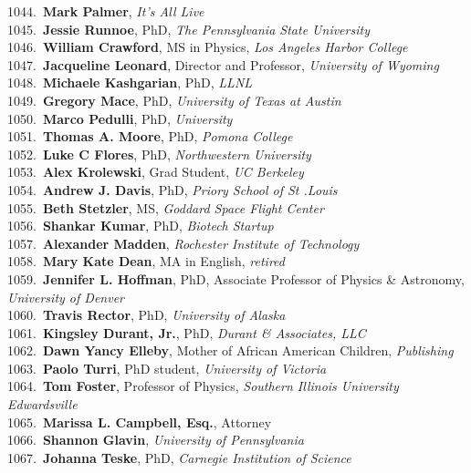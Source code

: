 1044.~{\bf Mark Palmer}, {\sl It's All Live} \\
1045.~{\bf Jessie Runnoe}, PhD, {\sl The Pennsylvania State University} \\
1046.~{\bf William Crawford}, MS in Physics, {\sl Los Angeles Harbor College} \\
1047.~{\bf Jacqueline Leonard}, Director and Professor, {\sl University of Wyoming} \\
1048.~{\bf Michaele Kashgarian}, PhD, {\sl LLNL} \\
1049.~{\bf Gregory Mace}, PhD, {\sl University of Texas at Austin} \\
1050.~{\bf Marco Pedulli}, PhD, {\sl University} \\
1051.~{\bf Thomas A. Moore}, PhD, {\sl Pomona College} \\
1052.~{\bf Luke C Flores}, PhD, {\sl Northwestern University} \\
1053.~{\bf Alex Krolewski}, Grad Student, {\sl UC Berkeley} \\
1054.~{\bf Andrew J. Davis}, PhD, {\sl Priory School of St .Louis} \\
1055.~{\bf Beth Stetzler}, MS, {\sl Goddard Space Flight Center} \\
1056.~{\bf Shankar Kumar}, PhD, {\sl Biotech Startup} \\
1057.~{\bf Alexander Madden}, {\sl Rochester Institute of Technology} \\
1058.~{\bf Mary Kate Dean}, MA in English, {\sl retired} \\
1059.~{\bf Jennifer L. Hoffman}, PhD, Associate Professor of Physics \& Astronomy, {\sl University of Denver} \\
1060.~{\bf Travis Rector}, PhD, {\sl University of Alaska} \\
1061.~{\bf Kingsley Durant, Jr.}, PhD, {\sl Durant \& Associates, LLC} \\
1062.~{\bf Dawn Yancy Elleby}, Mother of African American Children, {\sl Publishing} \\
1063.~{\bf Paolo Turri}, PhD student, {\sl University of Victoria} \\
1064.~{\bf Tom Foster}, Professor of Physics, {\sl Southern Illinois University Edwardsville} \\
1065.~{\bf Marissa L. Campbell, Esq.}, Attorney \\
1066.~{\bf Shannon Glavin}, {\sl University of Pennsylvania} \\
1067.~{\bf Johanna Teske}, PhD, {\sl Carnegie Institution of Science} \\
